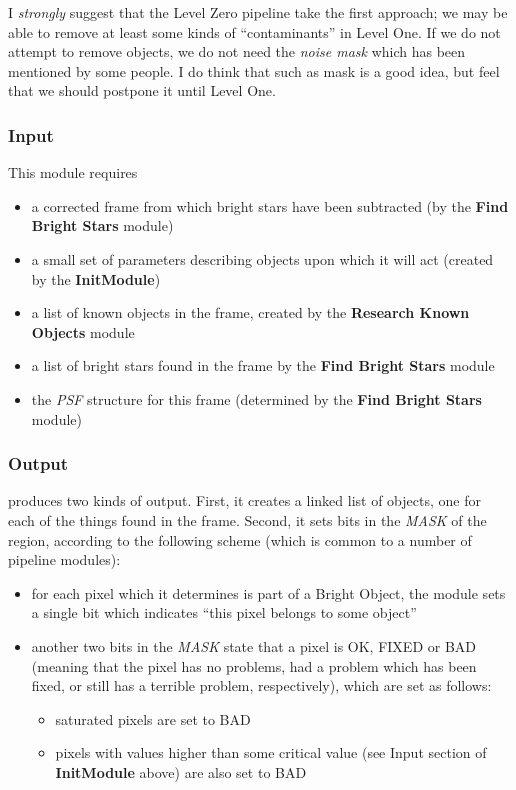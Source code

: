   I {\it strongly} suggest that the Level Zero pipeline take the
first approach; we may be able to remove at least some kinds of 
``contaminants'' in Level One.  If we do not attempt to remove
objects, we do not need the {\it noise mask} which has been
mentioned by some people.  I do think that such as mask is a
good idea, but feel that we should postpone it until Level One.

\subsubsection {Input}

  This module requires

\begin{itemize}
   \item a corrected frame from which bright stars have been subtracted
         (by the {\bf Find Bright Stars} module)
   \item a small set of parameters describing objects upon which it
         will act (created by the {\bf InitModule})
   \item a list of known objects in the frame, created by the 
         {\bf Research Known Objects} module
   \item a list of bright stars found in the frame by the {\bf Find Bright
         Stars} module
   \item the {\it PSF} structure for this frame (determined by
         the {\bf Find Bright Stars} module)
\end{itemize}

\subsubsection {Output}

  \bom produces two kinds of output. First, it creates a linked list of
objects, one for each of the things found in the frame.  Second, 
it sets bits in the {\it MASK} of the region, according to the following
scheme (which is common to a number of pipeline modules):

\begin{itemize}
  \item for each pixel which it determines is part of a Bright Object,
        the module sets a single bit which indicates 
        ``this pixel belongs to some object''
  \item another two bits in the {\it MASK} state that a pixel is
        OK, FIXED or BAD (meaning that the pixel has no problems,
        had a problem which has been fixed, or still has a terrible
        problem, respectively), which are set as follows:
  \begin{itemize}
    \item saturated pixels are set to BAD
    \item pixels with values higher than some critical value (see Input
          section of {\bf InitModule} above) are also set to BAD
  \end{itemize}
\end{itemize}

